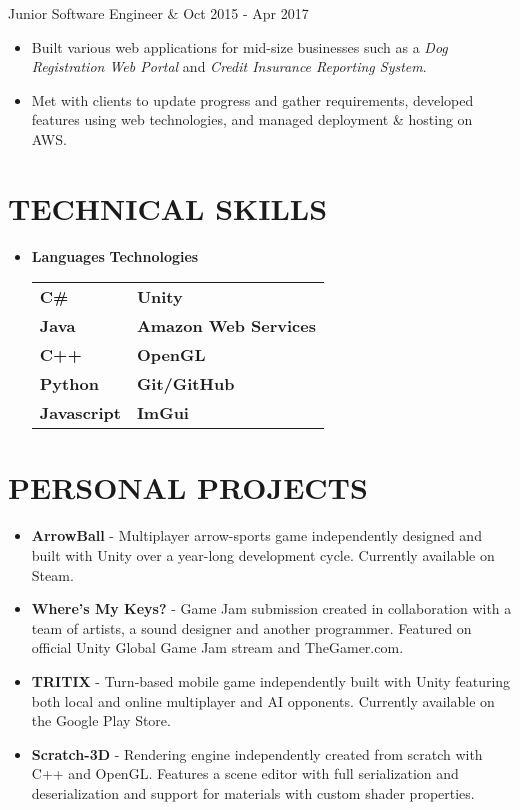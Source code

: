 \documentclass[resmargin,10pt]{res} %
\begin{document}
\begin{resume}
\begin{ncolumn}{2}
                Junior Software Engineer &  \hfill Oct 2015 - Apr 2017
                \end{ncolumn}
                \begin{itemize}           
                \item  Built various web applications for mid-size businesses such as a \textit{Dog Registration Web Portal} and \textit{Credit Insurance Reporting System}.
                \item Met with clients to update progress and gather requirements, developed features using web technologies, and managed deployment \& hosting on AWS.
                \end{itemize}
                    
\section{TECHNICAL SKILLS}	
							\begin{itemize}
                    		\item[] 
\textbf{\large Languages}  \hspace*{.5in} \textbf{\large Technologies}        \\
\begin{tabular}{ll}
\textbf{C\#} \hspace*{1in}  & \textbf{Unity} \\
\textbf{Java} & \textbf{Amazon Web Services} \\
\textbf{C++}   & \textbf{OpenGL}       \\
\textbf{Python}  & \textbf{Git/GitHub}               \\
\textbf{Javascript} & \textbf{ImGui}               \\
\end{tabular}
                    		\end{itemize} 
\section{PERSONAL PROJECTS}
				\begin{itemize}       
				\item \textbf{ArrowBall} - Multiplayer arrow-sports game independently designed and built with Unity over a year-long development cycle. Currently available on Steam.
                	\item \textbf{Where's My Keys?} - Game Jam submission created in collaboration with a team of artists, a sound designer and another programmer. Featured on official Unity Global Game Jam stream and TheGamer.com.
                	\item \textbf{TRITIX} - Turn-based mobile game independently built with Unity featuring both local and online multiplayer and AI opponents. Currently available on the Google Play Store.
                	\item \textbf{Scratch-3D} - Rendering engine independently created from scratch with C++ and OpenGL. Features a scene editor with full serialization and deserialization and support for materials with custom shader properties.
                \end{itemize}
                

\end{resume}
\end{document}
